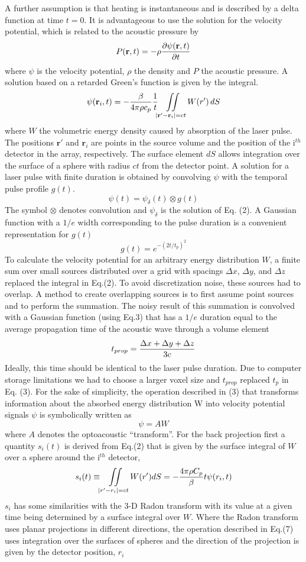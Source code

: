 \documentclass{article}
\begin{document}
A further assumption 
is that heating is instantaneous and is described by a delta 
function at time $t = 0$. It is advantageous to use 
the solution for the velocity potential, which is related to 
the acoustic pressure by
$$
P(\mathbf{r},t)= - \rho {\partial \psi(\mathbf{r},t)\over \partial t}
$$
where $\psi$ is the velocity potential, $\rho$ the density 
and $P$ the acoustic pressure. A solution based on a retarded Green's 
function is given by the integral.
$$
\psi (\mathbf{r}_i ,t)=-{\beta \over 4\pi\rho c_p } {1\over t}
\iint\limits_{\left| \mathbf{r}'-\mathbf{r}_i \right| =c t} W(r')\,dS
$$
where $W$ the volumetric 
energy density caused by absorption of the laser pulse. The positions
$\mathbf{r}'$ and $\mathbf{r}_i$ 
are points in the source volume and the position of the i$^{th}$ 
detector in the array, respectively. The surface element $dS$ allows 
integration over the surface of a sphere with radius $c t$ from 
the detector point. A solution for a laser pulse with finite 
duration is obtained by convolving $\psi$ with the temporal 
pulse profile $g(t)$. 
$$
\psi (t)=\psi_\delta (t) \otimes g(t)
$$
The symbol $\otimes$ denotes convolution and $\psi_\delta$ 
is the solution of Eq. (2). A Gaussian function 
with a $1/e$ width corresponding to the pulse duration is a
convenient representation for $g(t)$
$$
g(t)=e^{-(2t/t_p )^2}
$$
To calculate the velocity potential 
for an arbitrary energy distribution $W$, a finite sum over small 
sources distributed over a grid with spacings $\Delta x$, $\Delta y$,
and $\Delta z$ replaced the integral in Eq.(2). To avoid discretization 
noise, these sources had to overlap. A method to create overlapping 
sources is to first assume point sources and to perform the summation. 
The noisy result of this summation is convolved with a Gaussian 
function (using Eq.3) that has a $1/e$ duration equal to the average 
propagation time of the acoustic wave through a volume element
$$
t_{prop} ={\Delta x+\Delta y+\Delta z \over 3 c} 
$$
Ideally, this time should be identical to the laser pulse duration. 
Due to computer storage limitations we had to choose a larger 
voxel size and $t_{prop}$ replaced $t_p$ in Eq. (3). For the sake of 
simplicity, the operation described in (3) that transforms information 
about the absorbed energy distribution W into velocity potential 
signals $\psi$ is symbolically written as
$$
\psi =A W
$$
where $A$ denotes the optoacoustic ``transform''. For the back projection 
first a quantity $s_i(t)$ is derived from Eq.(2) that is given 
by the surface integral of $W$ over a sphere around the i$^{th}$ detector,
$$
s_i (t)\equiv \iint\limits_{\left| r' -r_i \right| =c t} W(r' ) dS=
-{4\pi  \rho  C_p \over \beta }   t  \psi (r_i ,t)
$$
$s_i$ has some similarities with the 3-D Radon transform with 
its value at a given time being determined by a surface integral 
over $W$. Where the Radon transform uses planar projections in 
different directions, the operation described in Eq.(7) uses 
integration over the surfaces of spheres and the direction of 
the projection is given by the detector position, $r_i$ 
\end{document}
